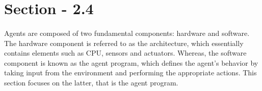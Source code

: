 \documentclass{article}
\begin{document}
















\section*{Section - 2.4}
  \paragraph{}
    Agents are composed of two fundamental components: hardware and software. 
    The hardware component is referred to as the architecture, which essentially contains elements such as CPU, sensors and actuators. 
    Whereas, the software component is known as the agent program, which defines the agent’s behavior by taking input from the environment and performing the appropriate actions. 
    This section focuses on the latter, that is the agent program.
   
\end{document}
